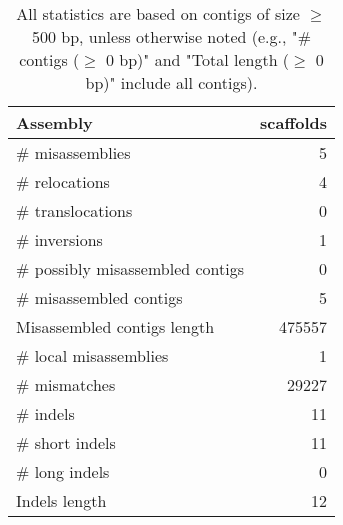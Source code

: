 \documentclass[12pt,a4paper]{article}
\begin{document}
\begin{table}[ht]
\begin{center}
\caption{All statistics are based on contigs of size $\geq$ 500 bp, unless otherwise noted (e.g., "\# contigs ($\geq$ 0 bp)" and "Total length ($\geq$ 0 bp)" include all contigs).}
\begin{tabular}{|l*{1}{|r}|}
\hline
Assembly & scaffolds \\ \hline
\# misassemblies & 5 \\ \hline
\hspace{5mm}\# relocations & 4 \\ \hline
\hspace{5mm}\# translocations & 0 \\ \hline
\hspace{5mm}\# inversions & 1 \\ \hline
\# possibly misassembled contigs & 0 \\ \hline
\# misassembled contigs & 5 \\ \hline
Misassembled contigs length & 475557 \\ \hline
\# local misassemblies & 1 \\ \hline
\# mismatches & 29227 \\ \hline
\# indels & 11 \\ \hline
\hspace{5mm}\# short indels & 11 \\ \hline
\hspace{5mm}\# long indels & 0 \\ \hline
Indels length & 12 \\ \hline
\end{tabular}
\end{center}
\end{table}
\end{document}
